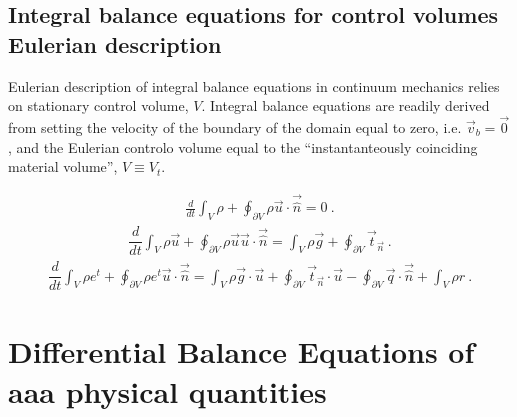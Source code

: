 \documentclass[letterpaper,10pt,english]{jupyterBook}
\begin{document}
\subsection{Integral balance equations for control volumes \sphinxhyphen{} Eulerian description}
\label{\detokenize{ch/continuum/balance-primary-integral:integral-balance-equations-for-control-volumes-eulerian-description}}\label{\detokenize{ch/continuum/balance-primary-integral:continuum-governing-equations-primary-integral-euler}}
\sphinxAtStartPar
Eulerian description of integral balance equations in continuum mechanics relies on stationary control volume, \(V\). Integral balance equations are readily derived from {\hyperref[\detokenize{ch/continuum/balance-primary-integral:continuum-governing-equations-primary-integral-arbitrary}]{}} setting the velocity of the boundary of the domain equal to zero, i.e. \(\vec{v}_b = \vec{0}\), and the Eulerian controlo volume equal to the “instantanteously coinciding material volume”, \(V \equiv V_t\).

\sphinxAtStartPar
{}
\begin{equation*}
\begin{split}\frac{d}{dt} \int_{V} \rho + \oint_{\partial V} \rho \vec{u} \cdot \vec{\hat{n}} = 0 \ .\end{split}
\end{equation*}
\sphinxAtStartPar
{}
\begin{equation*}
\begin{split}\dfrac{d}{dt} \int_{V} \rho \vec{u} + \oint_{\partial V} \rho \vec{u} \vec{u} \cdot \vec{\hat{n}} = \int_{V} \rho \vec{g} + \oint_{\partial V} \vec{t}_{\vec{n}} \ .\end{split}
\end{equation*}
\sphinxAtStartPar
{}
\begin{equation*}
\begin{split}\dfrac{d}{dt} \int_{V} \rho e^t + \oint_{\partial V} \rho e^t \vec{u} \cdot \vec{\hat{n}} = \int_{V} \rho \vec{g} \cdot \vec{u} + \oint_{\partial V} \vec{t}_{\vec{n}} \cdot \vec{u} - \oint_{\partial V} \vec{q} \cdot \vec{\hat{n}} + \int_{V} \rho r \ .\end{split}
\end{equation*}
\sphinxstepscope


\section{Differential Balance Equations of aaa physical quantities}
\label{\detokenize{ch/continuum/balance-primary-differential:differential-balance-equations-of-aaa-physical-quantities}}\label{\detokenize{ch/continuum/balance-primary-differential:continuum-governing-equations-primary-integral}}\label{\detokenize{ch/continuum/balance-primary-differential::doc}}
\end{document}
